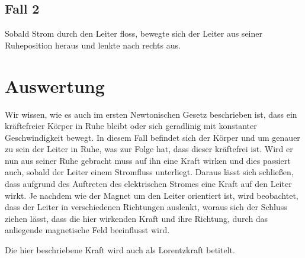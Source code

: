 \documentclass[
	fontsize=11pt,
	paper=a4,
	pagesize=auto,
	parskip=half,
	titlepage=on,
	ngerman
]{scrartcl}
\begin{document}
\subsection{Fall 2}

Sobald Strom durch den Leiter floss, bewegte sich der Leiter aus seiner Ruheposition heraus und lenkte nach rechts aus.

\section{Auswertung}

Wir wissen, wie es auch im ersten Newtonischen Gesetz beschrieben ist, dass ein kräftefreier Körper in Ruhe bleibt oder sich geradlinig mit konstanter Geschwindigkeit bewegt. In diesem Fall befindet sich der Körper und um genauer zu sein der Leiter in Ruhe, was zur Folge hat, dass dieser kräftefrei ist. Wird er nun aus seiner Ruhe gebracht muss auf ihn eine Kraft wirken und dies passiert auch, sobald der Leiter einem Stromfluss unterliegt. Daraus lässt sich schließen, dass aufgrund des Auftreten des elektrischen Stromes eine Kraft auf den Leiter wirkt. Je nachdem wie der Magnet um den Leiter orientiert ist, wird beobachtet, dass der Leiter in verschiedenen Richtungen auslenkt, woraus sich der Schluss ziehen lässt, dass die hier wirkenden Kraft und ihre Richtung, durch das anliegende magnetische Feld beeinflusst wird.

Die hier beschriebene Kraft wird auch als Lorentzkraft betitelt. 
\end{document}
